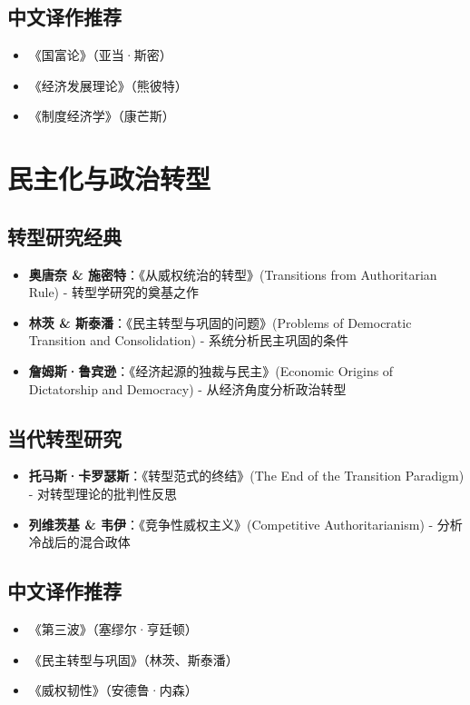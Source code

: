 \subsection{中文译作推荐}
\begin{itemize}
    \item 《国富论》（亚当·斯密）
    \item 《经济发展理论》（熊彼特）
    \item 《制度经济学》（康芒斯）
\end{itemize}

\section{民主化与政治转型}

\subsection{转型研究经典}
\begin{itemize}
    \item \textbf{奥唐奈 \& 施密特}：《从威权统治的转型》(Transitions from Authoritarian Rule)
    \quad - 转型学研究的奠基之作
    \item \textbf{林茨 \& 斯泰潘}：《民主转型与巩固的问题》(Problems of Democratic Transition and Consolidation)
    \quad - 系统分析民主巩固的条件
    \item \textbf{詹姆斯·鲁宾逊}：《经济起源的独裁与民主》(Economic Origins of Dictatorship and Democracy)
    \quad - 从经济角度分析政治转型
\end{itemize}

\subsection{当代转型研究}
\begin{itemize}
    \item \textbf{托马斯·卡罗瑟斯}：《转型范式的终结》(The End of the Transition Paradigm)
    \quad - 对转型理论的批判性反思
    \item \textbf{列维茨基 \& 韦伊}：《竞争性威权主义》(Competitive Authoritarianism)
    \quad - 分析冷战后的混合政体
\end{itemize}

\subsection{中文译作推荐}
\begin{itemize}
    \item 《第三波》（塞缪尔·亨廷顿）
    \item 《民主转型与巩固》（林茨、斯泰潘）
    \item 《威权韧性》（安德鲁·内森）
\end{itemize}

